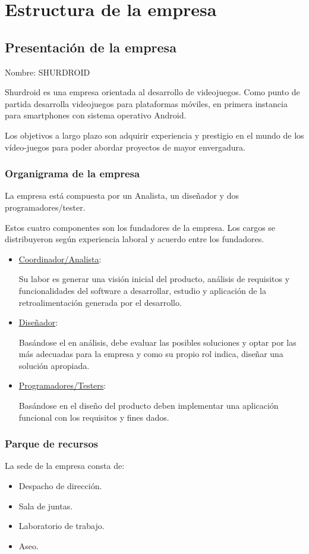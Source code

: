 \section{Estructura de la empresa}
\subsection{Presentación de la empresa}
Nombre: SHURDROID

Shurdroid es una empresa orientada al desarrollo de videojuegos. Como
punto de partida desarrolla videojuegos para plataformas móviles, en
primera instancia para smartphones con sistema operativo Android.

Los objetivos a largo plazo son adquirir experiencia y prestigio en el
mundo de los vídeo-juegos para poder abordar proyectos de mayor
envergadura.


\subsubsection{Organigrama de la empresa}
La empresa está compuesta por un Analista, un diseñador y dos
programadores/tester.

Estos cuatro componentes son los fundadores de la empresa. Los cargos
se distribuyeron según experiencia laboral y acuerdo entre los
fundadores.

\begin{itemize}
\item \underline{Coordinador/Analista}:

Su labor es generar una visión inicial del producto, análisis de
requisitos y funcionalidades del software a desarrollar, estudio y
aplicación de la retroalimentación generada por el desarrollo.
\item \underline{Diseñador}:

Basándose el en análisis, debe evaluar las posibles soluciones y optar
por las más adecuadas para la empresa y como su propio rol indica,
diseñar una solución apropiada.

\item \underline{Programadores/Testers}:

Basándose en el diseño del producto deben implementar una aplicación
funcional con los requisitos y fines dados.
\end{itemize}

\subsubsection{Parque de recursos}
La sede de la empresa consta de:
\begin{itemize}
\item Despacho de dirección.
\item Sala de juntas.
\item Laboratorio de trabajo.
\item Aseo.
\end{itemize}


